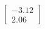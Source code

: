 \documentclass[preview]{standalone}
\begin{document}
\begin{align*}
\begin{bmatrix} -3.12 \\ 2.06 \end{bmatrix}
\end{align*}
\end{document}
